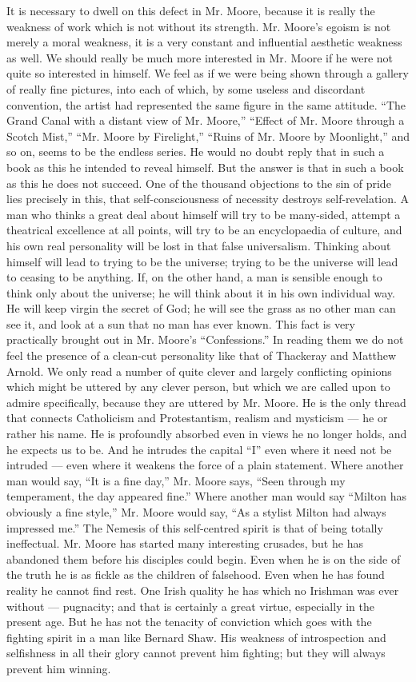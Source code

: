 It is necessary to dwell on this defect in Mr. Moore, because it is really the weakness of work which is not without its strength. Mr. Moore’s egoism is not merely a moral weakness, it is a very constant and influential aesthetic weakness as well. We should really be much more interested in Mr. Moore if he were not quite so interested in himself. We feel as if we were being shown through a gallery of really fine pictures, into each of which, by some useless and discordant convention, the artist had represented the same figure in the same attitude. “The Grand Canal with a distant view of Mr. Moore,” “Effect of Mr. Moore through a Scotch Mist,” “Mr. Moore by Firelight,” “Ruins of Mr. Moore by Moonlight,” and so on, seems to be the endless series. He would no doubt reply that in such a book as this he intended to reveal himself. But the answer is that in such a book as this he does not succeed. One of the thousand objections to the sin of pride lies precisely in this, that self-consciousness of necessity destroys self-revelation. A man who thinks a great deal about himself will try to be many-sided, attempt a theatrical excellence at all points, will try to be an encyclopaedia of culture, and his own real personality will be lost in that false universalism. Thinking about himself will lead to trying to be the universe; trying to be the universe will lead to ceasing to be anything. If, on the other hand, a man is sensible enough to think only about the universe; he will think about it in his own individual way. He will keep virgin the secret of God; he will see the grass as no other man can see it, and look at a sun that no man has ever known. This fact is very practically brought out in Mr. Moore’s “Confessions.” In reading them we do not feel the presence of a clean-cut personality like that of Thackeray and Matthew Arnold. We only read a number of quite clever and largely conflicting opinions which might be uttered by any clever person, but which we are called upon to admire specifically, because they are uttered by Mr. Moore. He is the only thread that connects Catholicism and Protestantism, realism and mysticism — he or rather his name. He is profoundly absorbed even in views he no longer holds, and he expects us to be. And he intrudes the capital “I” even where it need not be intruded — even where it weakens the force of a plain statement. Where another man would say, “It is a fine day,” Mr. Moore says, “Seen through my temperament, the day appeared fine.” Where another man would say “Milton has obviously a fine style,” Mr. Moore would say, “As a stylist Milton had always impressed me.” The Nemesis of this self-centred spirit is that of being totally ineffectual. Mr. Moore has started many interesting crusades, but he has abandoned them before his disciples could begin. Even when he is on the side of the truth he is as fickle as the children of falsehood. Even when he has found reality he cannot find rest. One Irish quality he has which no Irishman was ever without — pugnacity; and that is certainly a great virtue, especially in the present age. But he has not the tenacity of conviction which goes with the fighting spirit in a man like Bernard Shaw. His weakness of introspection and selfishness in all their glory cannot prevent him fighting; but they will always prevent him winning.

